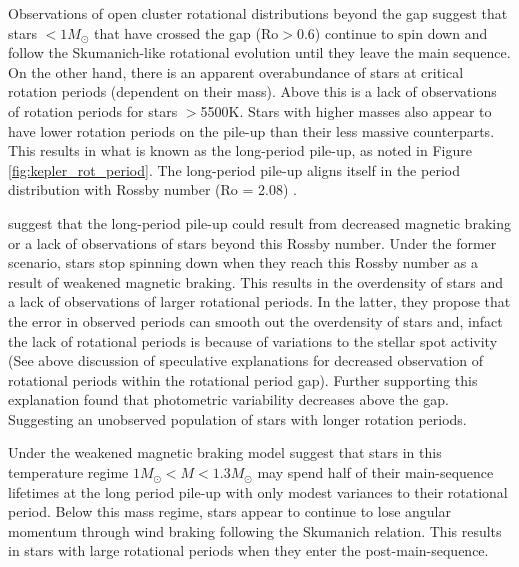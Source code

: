 Observations of open cluster rotational distributions beyond the gap suggest that stars $<1M_{\odot}$ that have crossed the gap (Ro$>$0.6) continue to spin down and follow the Skumanich-like rotational evolution until they leave the main sequence.
On the other hand, there is an apparent overabundance of stars at critical rotation periods (dependent on their mass). 
Above this is a lack of observations of rotation periods for stars $>$5500K.
Stars with higher masses also appear to have lower rotation periods on the pile-up than their less massive counterparts.
This results in what is known as the long-period pile-up, as noted in Figure \ref{fig:kepler_rot_period}.
The long-period pile-up aligns itself in the \citet{mcquillan_rotation_2014} period distribution with Rossby number  (Ro = 2.08) \citep{van_saders_forward_2019}.
 
\citet{van_saders_forward_2019} suggest that the long-period pile-up could result from decreased magnetic braking or a lack of observations of stars beyond this Rossby number.
Under the former scenario, stars stop spinning down when they reach this Rossby number as a result of weakened magnetic braking.
This results in the overdensity of stars and a lack of observations of larger rotational periods.
In the latter, they propose that the error in observed periods can smooth out the overdensity of stars and, infact the lack of rotational periods is because of variations to the stellar spot activity (See above discussion of speculative explanations for decreased observation of rotational periods within the rotational period gap).
Further supporting this explanation \citet{david_further_2022} found that photometric variability decreases above the gap.
Suggesting an unobserved population of stars with longer rotation periods.

Under the weakened magnetic braking model \citet{david_further_2022} suggest that stars in this temperature regime $1M_{\odot} < M < 1.3M_{\odot}$ may spend half of their main-sequence lifetimes at the long period pile-up with only modest variances to their rotational period.
Below this mass regime, stars appear to continue to lose angular momentum through wind braking following the Skumanich relation.
This results in stars with large rotational periods when they enter the post-main-sequence.

